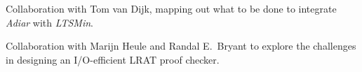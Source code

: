 \begin{itemize}

  Collaboration with Tom van Dijk, mapping out what to be done to integrate
  \emph{Adiar} with \emph{LTSMin}.


  Collaboration with Marijn Heule and Randal E.\ Bryant to explore the
  challenges in designing an I/O-efficient LRAT proof checker.
\end{itemize}
